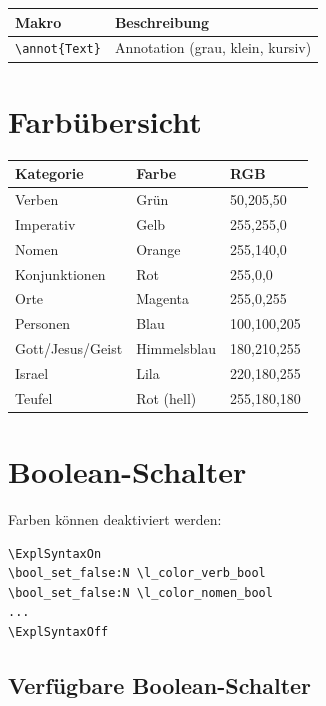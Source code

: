 \documentclass[12pt,a4paper]{scrartcl}
\begin{document}
\begin{tabular}{ll}
\toprule
\textbf{Makro} & \textbf{Beschreibung} \\
\midrule
\lstinline|\annot{Text}| & Annotation (grau, klein, kursiv) \\
\bottomrule
\end{tabular}

\section{Farb{\"u}bersicht}

\begin{tabular}{lll}
\toprule
\textbf{Kategorie} & \textbf{Farbe} & \textbf{RGB} \\
\midrule
Verben & Gr{\"u}n & 50,205,50 \\
Imperativ & Gelb & 255,255,0 \\
Nomen & Orange & 255,140,0 \\
Konjunktionen & Rot & 255,0,0 \\
Orte & Magenta & 255,0,255 \\
Personen & Blau & 100,100,205 \\
Gott/Jesus/Geist & Himmelsblau & 180,210,255 \\
Israel & Lila & 220,180,255 \\
Teufel & Rot (hell) & 255,180,180 \\
\bottomrule
\end{tabular}

\section{Boolean-Schalter}

Farben k{\"o}nnen deaktiviert werden:

\begin{lstlisting}
\ExplSyntaxOn
\bool_set_false:N \l_color_verb_bool
\bool_set_false:N \l_color_nomen_bool
...
\ExplSyntaxOff
\end{lstlisting}

\subsection{Verf{\"u}gbare Boolean-Schalter}
\end{document}

